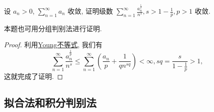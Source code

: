 \documentclass[../../main.tex]{subfiles}%
\begin{document}
\begin{example}
设 $a_n > 0$, $\sum_{n=1}^{\infty} a_n$ 收敛, 证明级数 $\sum_{n=1}^{\infty} \frac{a_n^{\frac{1}{p}}}{n^s}, s > 1 - \frac{1}{p}, p > 1$ 收敛.
\end{example}
\begin{remark}
本题也可用分组判别法进行证明.
\end{remark}
\begin{proof}

利用\hyperref[theorem:Young不等式]{Young不等式}, 我们有
\[
\sum_{n=1}^{\infty} \frac{a_n^{\frac{1}{p}}}{n^s} \leqslant \sum_{n=1}^{\infty} \left( \frac{a_n}{p} + \frac{1}{q n^{s q}} \right) < \infty, s q = \frac{s}{1 - \frac{1}{p}} > 1,
\]
这就完成了证明.

\end{proof}


\subsection{拟合法和积分判别法}
\end{document}

